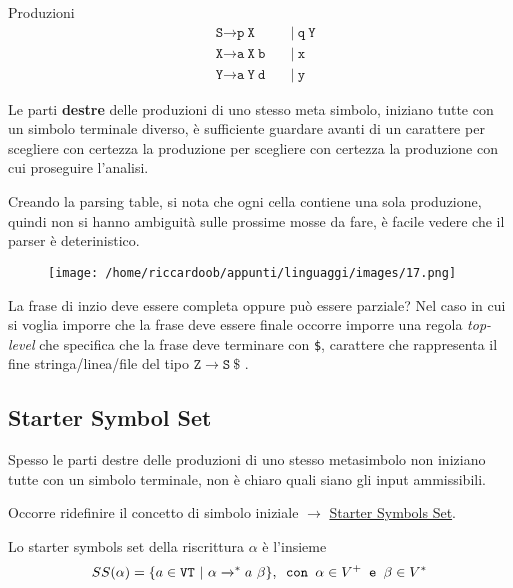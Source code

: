 Produzioni
\begin{equation*}
    \begin{aligned}
        &\texttt{S} \rightarrow \texttt{p}\ \texttt{X}\ &&|\ \texttt{q}\ \texttt{Y}\\
        &\texttt{X} \rightarrow \texttt{a}\ \texttt{X}\ \texttt{b}\ &&|\ \texttt{x}\\
        &\texttt{Y} \rightarrow \texttt{a}\ \texttt{Y}\ \texttt{d}\ &&|\ \texttt{y}
    \end{aligned}
\end{equation*}

Le parti \textbf{destre} delle produzioni di uno stesso meta simbolo, iniziano tutte con un simbolo terminale diverso, è sufficiente guardare avanti di un carattere per scegliere con certezza la produzione per scegliere con certezza la produzione con cui proseguire l'analisi.

Creando la parsing table, si nota che ogni cella contiene una sola produzione, quindi non si hanno ambiguità sulle prossime mosse da fare, è facile vedere che il parser è deterinistico.

\begin{figure}[H]
    \centering
    \texttt{[image: /home/riccardoob/appunti/linguaggi/images/17.png]}
\end{figure}

La frase di inzio deve essere completa oppure può essere parziale? Nel caso in cui si voglia imporre che la frase deve essere finale occorre imporre una regola \textit{top-level} che specifica che la frase deve terminare con \texttt{\$}, carattere che rappresenta il fine stringa/linea/file del tipo $\texttt{Z} \rightarrow \texttt{S}\ \$$ .

\subsection{Starter Symbol Set}
Spesso le parti destre delle produzioni di uno stesso metasimbolo non iniziano tutte con un simbolo terminale, non è chiaro quali siano gli input ammissibili.

Occorre ridefinire il concetto di simbolo iniziale $\rightarrow$ \underline{Starter Symbols Set}.

Lo starter symbols set della riscrittura $\alpha$ è l'insieme
\begin{equation*}
    SS(\alpha) = \{ a \in \texttt{VT}\ |\ \alpha \xrightarrow{}\mathrel{\vphantom{\to}^*} a\ \beta\}, \texttt{ con } \alpha \in V^+ \texttt{ e } \beta \in V^*
\end{equation*}

